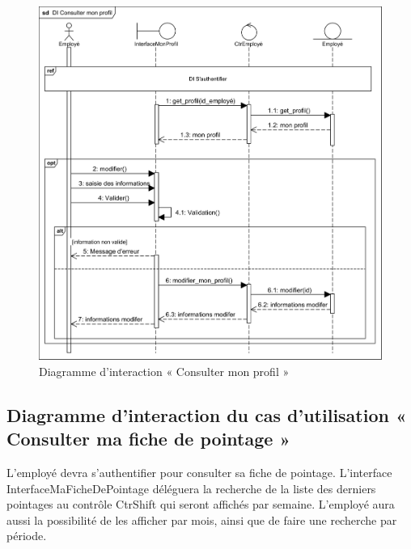 \begin{figure}[h!]
    \centering
    \includegraphics[scale=0.86]{images/DS/consulter_mon_profile}
    \caption{Diagramme d'interaction « Consulter mon profil »}
    \label{fig35}
\end{figure}

\clearpage
    
\subsection*{Diagramme d'interaction du cas d'utilisation « Consulter ma fiche de pointage »}
L’employé devra s’authentifier pour consulter sa fiche de pointage. L’interface 
InterfaceMaFicheDePointage déléguera la recherche de la liste des derniers 
pointages au contrôle CtrShift qui seront affichés par semaine. L’employé aura 
aussi la possibilité de les afficher par mois, ainsi que de faire une recherche 
par période. 
        
